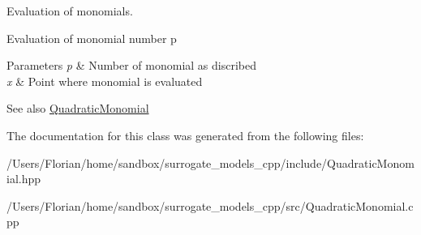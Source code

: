 Evaluation of monomials. 

Evaluation of monomial number p 
\begin{DoxyParams}{Parameters}
{\em p} & Number of monomial as discribed \\
\hline
{\em x} & Point where monomial is evaluated \\
\hline
\end{DoxyParams}
\begin{DoxySeeAlso}{See also}
\hyperlink{class_quadratic_monomial}{Quadratic\+Monomial} 
\end{DoxySeeAlso}


The documentation for this class was generated from the following files\+:\begin{DoxyCompactItemize}
\item 
/\+Users/\+Florian/home/sandbox/surrogate\+\_\+models\+\_\+cpp/include/Quadratic\+Monomial.\+hpp\item 
/\+Users/\+Florian/home/sandbox/surrogate\+\_\+models\+\_\+cpp/src/Quadratic\+Monomial.\+cpp\end{DoxyCompactItemize}
